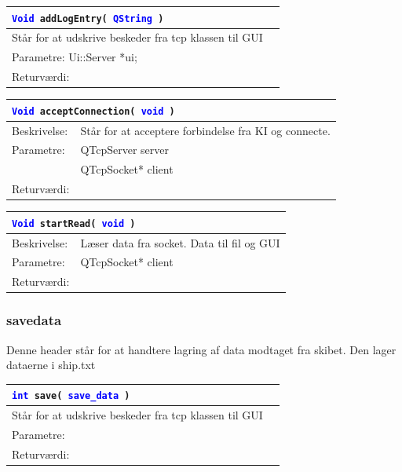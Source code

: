 \begin{table}[H]
\begin{tabular}{l p{12.5cm}}
\multicolumn{2}{l}{\texttt{\textcolor{blue}{Void} addLogEntry( \textcolor{blue}{QString} )}} \\
\hline
Står for at udskrive beskeder fra tcp klassen til GUI \\
Parametre: Ui::Server *ui;\\
Returværdi:&\\
\end{tabular}
\end{table}

\begin{table}[H]
\begin{tabular}{l p{12.5cm}}
\multicolumn{2}{l}{\texttt{\textcolor{blue}{Void} acceptConnection( \textcolor{blue}{void} )}} \\
\hline
Beskrivelse:&Står for at acceptere forbindelse fra KI og connecte.\\
Parametre:&QTcpServer server\\
				&QTcpSocket* client\\
Returværdi:&\\
\end{tabular}
\end{table}

\begin{table}[H]
\begin{tabular}{l p{12.5cm}}
\multicolumn{2}{l}{\texttt{\textcolor{blue}{Void} startRead( \textcolor{blue}{void} )}} \\
\hline
Beskrivelse:&Læser data fra socket. Data til fil og GUI\\
Parametre:&QTcpSocket* client\\
Returværdi:&\\
\end{tabular}
\end{table}

\subsubsection{savedata}
Denne header står for at handtere lagring af data modtaget fra skibet. Den lager dataerne i ship.txt

\begin{table}[H]
\begin{tabular}{l p{12.5cm}}
\multicolumn{2}{l}{\texttt{\textcolor{blue}{int} save( \textcolor{blue}{save\_data} )}} \\
\hline
Står for at udskrive beskeder fra tcp klassen til GUI \\
Parametre: \\
Returværdi:&\\
\end{tabular}
\end{table}

